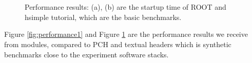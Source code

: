 \documentclass{webofc}
\begin{document}
\begin{figure}
\centering
    \begin{minipage}{.48\textwidth}
 　 \end{minipage}\hfill
    \begin{minipage}{.48\textwidth}
 　 \end{minipage}
\caption{Performance results: (a), (b) are the startup time of ROOT and hsimple tutorial, which are the basic benchmarks.}
\label{fig:performance2}
\end{figure}

Figure \ref{fig:performance1} and Figure \ref{fig:performance2} are the performance results we receive from modules, compared to PCH and textual headers which is synthetic benchmarks close to the experiment software stacks.
\end{document}
